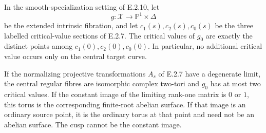 \begin{proposition}
In the smooth-specialization setting of E.2.10, let
\[
 g:\mathcal X\longrightarrow\mathbb P^1\times\Delta
\]
be the extended intrinsic fibration, and let
$c_1(s),c_2(s),c_0(s)$ be the three labelled critical-value
sections of E.2.7.  The critical values of $g_0$ are exactly
the distinct points among $c_1(0),c_2(0),c_0(0)$.
In particular, no additional critical value occurs only
on the central target curve.

If the normalizing projective transformations $A_s$ of
E.2.7 have a degenerate limit, the central regular fibres
are isomorphic complex two-tori and $g_0$ has at most two
critical values.  If the constant image of the limiting
rank-one matrix is $0$ or $1$, this torus is the
corresponding finite-root abelian surface.  If that image
is an ordinary source point, it is the ordinary torus at
that point and need not be an abelian surface.  The cusp
cannot be the constant image.
\end{proposition}
